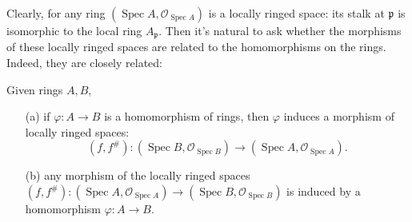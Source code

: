 \documentclass[12pt,letter]{article}
\newcommand{\Spec}[0]{\operatorname{Spec}}
\begin{document}
	Clearly, for any ring $(\Spec A, \mathscr O_{\Spec A})$ is a locally ringed space: its stalk at $\mathfrak p$ is isomorphic to the local ring $A_{\mathfrak p}$. Then it's natural to ask whether the morphisms of these locally ringed spaces are related to the homomorphisms on the rings. Indeed, they are closely related:
	\begin{lemma}\label{l221}
	Given rings $A, B$,
	\begin{enumerate}
	\item[(a)] if $\varphi: A\to B$ is a homomorphism of rings, then $\varphi$ induces a morphism of locally ringed spaces:
	\[(f, f^\#):(\Spec B, \mathscr O_{\Spec B})\to (\Spec A, \mathscr O_{\Spec A}).\]
	\item[(b)] any morphism of the locally ringed spaces $(f, f^\#):(\Spec A, \mathscr O_{\Spec A})\to (\Spec B, \mathscr O_{\Spec B})$ is induced by a homomorphism $\varphi: A\to B$.
	\end{enumerate}
	\end{lemma}
\end{document}
